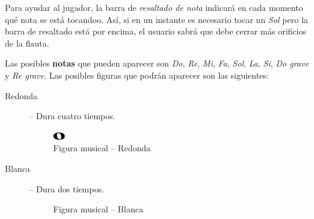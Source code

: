Para ayudar al jugador, la barra de \textit{resaltado de nota} indicará en cada
momento qué nota se está tocandoo. Así, si en un instante es necesario tocar un
\textit{Sol} pero la barra de resaltado está por encima, el usuario sabrá que
debe cerrar más orificios de la flauta.

Las posibles \textbf{notas} que pueden aparecer son \textit{Do}, \textit{Re},
\textit{Mi}, \textit{Fa}, \textit{Sol}, \textit{La}, \textit{Si}, \textit{Do
  grave} y \textit{Re grave}. Las posibles figuras que podrán aparecer son las
siguientes:

\begin{description}
\item[Redonda] -- Dura cuatro tiempos.
\vspace{-0.1cm}
\begin{figure}[h!]
  \centering
  \includegraphics[width=0.05\textwidth]{apendice_manual_usuario/imagen_figRedonda}
  \caption{Figura musical -- Redonda}
\end{figure}

\vspace{-0.35cm}

\item[Blanca] -- Dura dos tiempos.
\vspace{-0.1cm}
\begin{figure}[h!]
  \centering
  \caption{Figura musical -- Blanca}
\end{figure}

\vspace{-0.35cm}


\end{description}
